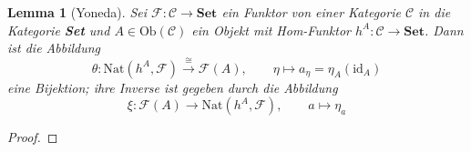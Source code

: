 \documentclass[a4paper, 11pt]{scrartcl}
\newcommand{\Hom}{\text{Hom}}
\newcommand{\id}{\text{id}}
\newcommand{\Ob}{\text{Ob}}
\theoremstyle{basicstyle}
\newtheorem{lemma}[definition]{Lemma}
\begin{document}
    \begin{lemma}[Yoneda]\label{lem:yoneda}
        Sei \(\mathcal{F}: \mathcal{C} \to \textbf{Set}\) ein Funktor von einer Kategorie \(\mathcal{C}\) in die Kategorie \textbf{Set} und \(A \in \Ob(\mathcal{C})\) ein Objekt mit Hom-Funktor \(h^A : \mathcal{C} \to \textbf{Set}\).
        Dann ist die Abbildung
        \[\theta : \text{Nat}(h^A, \mathcal{F}) \overset{\cong}{\longrightarrow} \mathcal{F}(A), \qquad \eta \mapsto a_{\eta} = \eta_A(\id_A)\]
        eine Bijektion; ihre Inverse ist gegeben durch die Abbildung
        \[\xi : \mathcal{F}(A) \longrightarrow \text{Nat}(h^A, \mathcal{F}), \qquad a \mapsto \eta_a\]
    \end{lemma}
    \begin{proof}
    \end{proof}
\end{document}
